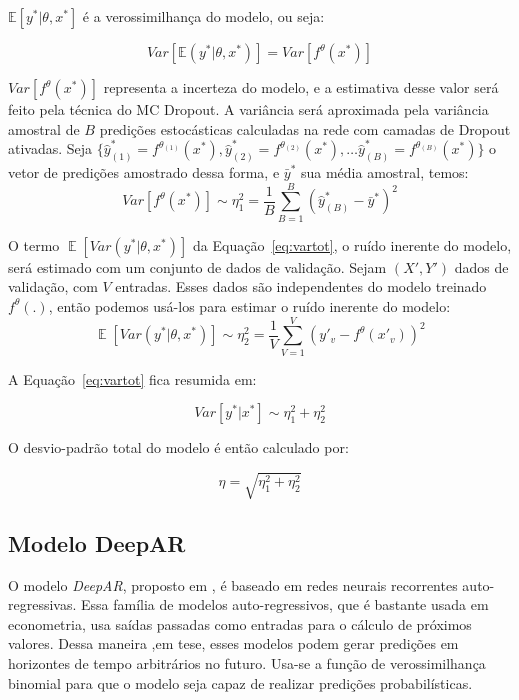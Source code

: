 $\mathbb{E}[y^* | \theta,x^*]$ é a verossimilhança do modelo, ou seja:

\[
  Var[\mathbb{E}(y^* | \theta,x^*)] = Var[f^\theta(x^*)]
\]

$Var[f^\theta(x^*)]$ representa a incerteza do modelo, e a estimativa desse valor será feito pela técnica do MC Dropout. A variância
será aproximada pela variância amostral de $B$ predições estocásticas calculadas
na rede com camadas de Dropout ativadas. Seja $\{\hat{y}^*_{(1)}=f^{\theta_{(1)}}(x^*),\hat{y}^*_{(2)}=f^{\theta_{(2)}}(x^*), \dots
\hat{y}^*_{(B)}=f^{\theta_{(B)}}(x^*)\}$ o vetor de predições amostrado dessa forma, e $\bar{y}^*$ sua
média amostral, temos: \\

\[   Var[f^\theta(x^*)] \sim \eta_1^2 = \frac{1}{B}\sum^B_{B=1}(\hat{y}^*_{(B)} - \bar{y}^*)^2  \]

O termo $\mathop{\mathbb{E}}[Var(y^* | \theta,x^*)]$ da Equação~\ref{eq:vartot}, o
ruído inerente do modelo, será estimado com um conjunto de dados de validação.
Sejam $(X',Y')$ dados de validação, com
$V$ entradas. Esses dados são independentes do modelo
treinado $f^\theta(.)$, então podemos usá-los para estimar o ruído inerente do
modelo: \\

\[
  \mathop{\mathbb{E}}[Var(y^* | \theta,x^*)] \sim \eta_2^2 = \frac{1}{V}\sum^V_{V=1}(y'_v - f^\theta(x'_v))^2
\]



A Equação~\ref{eq:vartot} fica resumida em:


\[ Var[y^* | x^*] \sim \eta^2_1 + \eta^2_2 \] 

O desvio-padrão total do modelo é então calculado por:

\[
  \eta = \sqrt{\eta^2_1 + \eta^2_2}  
\]


\subsection{Modelo DeepAR}

O modelo \textit{DeepAR}, proposto em \citep{deepar}, é baseado em redes neurais
recorrentes auto-regressivas. Essa família de modelos auto-regressivos, que é bastante usada em
econometria, usa saídas passadas como entradas para o cálculo de próximos
valores. Dessa maneira ,em tese, esses modelos podem gerar predições em horizontes
de tempo arbitrários no futuro.
Usa-se a função de verossimilhança binomial para que o modelo seja capaz
de realizar predições probabilísticas.

